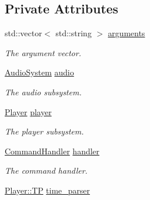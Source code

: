 \subsection*{Private Attributes}
\begin{DoxyCompactItemize}
\item 
\hypertarget{classplayd_a58d45d86bd51dea16f476aae648ff63c}{std\+::vector$<$ std\+::string $>$ \hyperlink{classplayd_a58d45d86bd51dea16f476aae648ff63c}{arguments}}\label{classplayd_a58d45d86bd51dea16f476aae648ff63c}

\begin{DoxyCompactList}\small\item\em The argument vector. \end{DoxyCompactList}\item 
\hypertarget{classplayd_a2c7193680bd18f1e9b3f63f2234485de}{\hyperlink{classAudioSystem}{Audio\+System} \hyperlink{classplayd_a2c7193680bd18f1e9b3f63f2234485de}{audio}}\label{classplayd_a2c7193680bd18f1e9b3f63f2234485de}

\begin{DoxyCompactList}\small\item\em The audio subsystem. \end{DoxyCompactList}\item 
\hypertarget{classplayd_a8712fc23f3139a2fd2e9dbfb24b998dd}{\hyperlink{classPlayer}{Player} \hyperlink{classplayd_a8712fc23f3139a2fd2e9dbfb24b998dd}{player}}\label{classplayd_a8712fc23f3139a2fd2e9dbfb24b998dd}

\begin{DoxyCompactList}\small\item\em The player subsystem. \end{DoxyCompactList}\item 
\hypertarget{classplayd_a738bb18c13d3fd7db82ce000dd43d604}{\hyperlink{classCommandHandler}{Command\+Handler} \hyperlink{classplayd_a738bb18c13d3fd7db82ce000dd43d604}{handler}}\label{classplayd_a738bb18c13d3fd7db82ce000dd43d604}

\begin{DoxyCompactList}\small\item\em The command handler. \end{DoxyCompactList}\item 
\hypertarget{classplayd_af9e02b98b1eadecaab2941481dfb803b}{\hyperlink{classPlayer_ab2c65f4a7cbaf6aab6fafbb5633a42c4}{Player\+::\+T\+P} \hyperlink{classplayd_af9e02b98b1eadecaab2941481dfb803b}{time\+\_\+parser}}\label{classplayd_af9e02b98b1eadecaab2941481dfb803b}


\end{DoxyCompactItemize}
